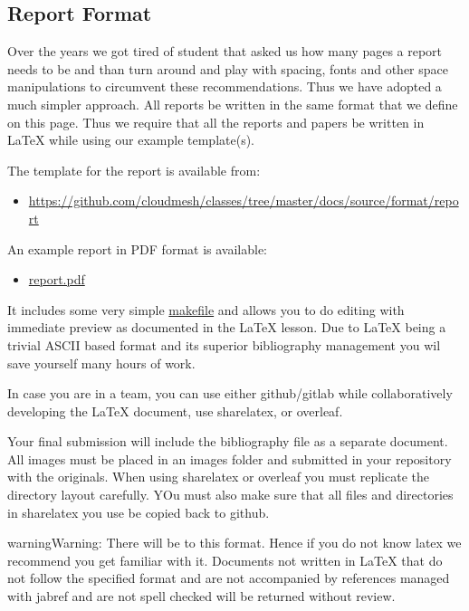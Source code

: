 \subsection{Report Format}
\label{\detokenize{lesson/doc/report:report-format}}\label{\detokenize{lesson/doc/report::doc}}\label{\detokenize{lesson/doc/report:reports}}
Over the years we got tired of student that asked us how many pages a
report needs to be and than turn around and play with spacing, fonts
and other space manipulations to circumvent these
recommendations. Thus we have adopted a much simpler approach. All
reports  be written in the same format that we define on this
page. Thus we require that all the reports and papers be written in
LaTeX while using our  example template(s).

The template for the report is available from:
\begin{itemize}
\item {} 
\url{https://github.com/cloudmesh/classes/tree/master/docs/source/format/report}

\end{itemize}

An example report in PDF format is available:
\begin{itemize}
\item {} 
\href{https://github.com/cloudmesh/classes/blob/master/docs/source/format/report/report.pdf}{report.pdf}

\end{itemize}

It includes some very simple \href{https://github.com/cloudmesh/classes/blob/master/docs/source/format/report/Makefile}{makefile}
and allows you to do editing with immediate preview as documented in
the LaTeX lesson.  Due to LaTeX being a trivial ASCII based format and
its superior bibliography management you wil save yourself many hours
of work.

In case you are in a team, you can use either github/gitlab while
collaboratively developing the LaTeX document, use sharelatex, or
overleaf.

Your final submission will include the bibliography file as a separate
document. All images must be placed in an images folder and submitted
in your repository with the originals. When using sharelatex or
overleaf you must replicate the directory layout carefully. YOu must
also make sure that all files and directories in sharelatex you use be
copied back to github.

\begin{sphinxadmonition}{warning}{Warning:}
There will be  to this format. Hence if
you do not know latex we recommend you get familiar with
it. Documents not written in LaTeX that do not follow the
specified format and are not accompanied by references
managed with jabref and are not spell checked will be
returned without review.
\end{sphinxadmonition}

